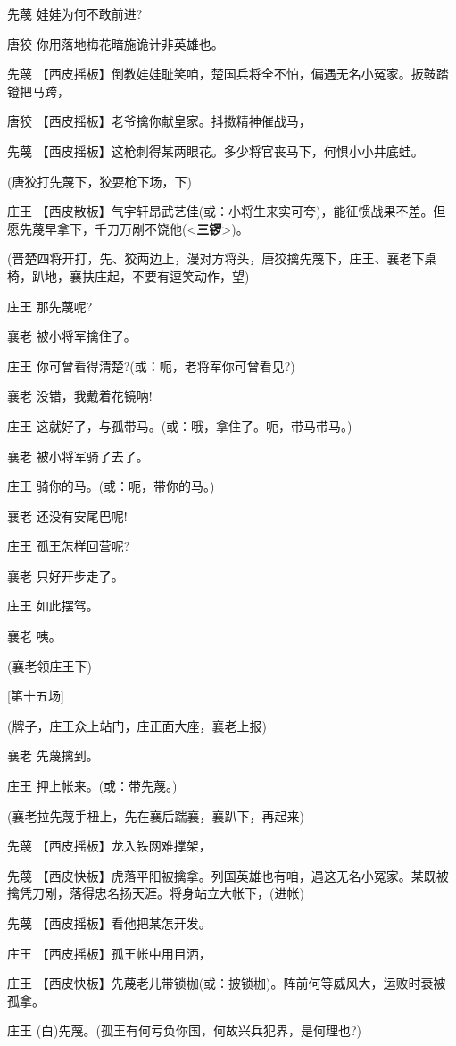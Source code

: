 先蔑 娃娃为何不敢前进?

唐狡 你用落地梅花暗施诡计非英雄也。

先蔑
【西皮摇板】倒教娃娃耻笑咱，楚国兵将全不怕，偏遇无名小冤家。扳鞍踏镫把马跨，

唐狡 【西皮摇板】老爷擒你献皇家。抖擞精神催战马，

先蔑 【西皮摇板】这枪刺得某两眼花。多少将官丧马下，何惧小小井底蛙。

(唐狡打先蔑下，狡耍枪下场，下)

庄王
【西皮散板】气宇轩昂武艺佳(或：小将生来实可夸)，能征惯战果不差。但愿先蔑早拿下，千刀万剐不饶他(\textless{}\textbf{三锣}\textgreater{})。

(晋楚四将开打，先、狡两边上，漫对方将头，唐狡擒先蔑下，庄王、襄老下桌椅，趴地，襄扶庄起，不要有逗笑动作，望)

庄王 那先蔑呢?

襄老 被小将军擒住了。

庄王 你可曾看得清楚?(或：呃，老将军你可曾看见?)

襄老 没错，我戴着花镜呐!

庄王 这就好了，与孤带马。(或：哦，拿住了。呃，带马带马。)

襄老 被小将军骑了去了。

庄王 骑你的马。(或：呃，带你的马。)

襄老 还没有安尾巴呢!

庄王 孤王怎样回营呢?

襄老 只好开步走了。

庄王 如此摆驾。

襄老 咦。

(襄老领庄王下)

{[}第十五场{]}

(牌子，庄王众上站门，庄正面大座，襄老上报)

襄老 先蔑擒到。

庄王 押上帐来。(或：带先蔑。)

(襄老拉先蔑手杻上，先在襄后踹襄，襄趴下，再起来)

先蔑 【西皮摇板】龙入铁网难撑架，

先蔑
【西皮快板】虎落平阳被擒拿。列国英雄也有咱，遇这无名小冤家。某既被擒凭刀剐，落得忠名扬天涯。将身站立大帐下，(进帐)

先蔑 【西皮摇板】看他把某怎开发。

庄王 【西皮摇板】孤王帐中用目洒，

庄王
【西皮快板】先蔑老儿带锁枷(或：披锁枷)。阵前何等威风大，运败时衰被孤拿。

庄王 (白)先蔑。(孤王有何亏负你国，何故兴兵犯界，是何理也?)

